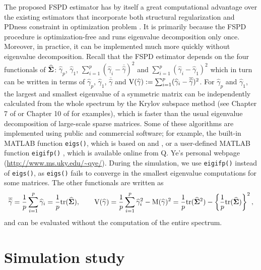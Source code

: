 \documentclass[times,sort&compress,3p]{elsarticle}
\newcommand{\NN}{\nonumber}
\newcommand{\tr}{\mathrm{tr}}
\begin{document}
The proposed FSPD estimator has by itself a great computational advantage over the existing estimators
that incorporate both structural regularization and PDness constraint in optimization problem
\citep{Rothman2012,Xue2012,Liu2014}. It is primarily because the FSPD procedure is optimization-free
and runs eigenvalue decomposition only once. Moreover, in practice, it can be implemented much more quickly without eigenvalue decomposition.
Recall that the FSPD estimator depends on the four functionals of $\widehat{\bf \Sigma}$: $\widehat{\gamma}_{p}$, $\widehat{\gamma}_{1}$, 
$\sum_{i=1}^p ({\widehat{\gamma}}_i - {\overline{\widehat{\gamma}}})^2$ and $\sum_{i=1}^p ({\widehat{\gamma}}_i - {\widehat{\gamma}}_1)^2$ which in turn can be written in terms of 
$\widehat{\gamma}_{p}$, $\widehat{\gamma}_{1}$, $\overline{\widehat{\gamma}}$ 
and ${\rm V}(\widehat{\gamma}) := \sum_{i=1}^p ({\widehat{\gamma}}_i - {\overline{\widehat{\gamma}}})^2$. 
For $\widehat{\gamma}_{p}$ and $\widehat{\gamma}_{1}$, the largest and
smallest eigenvalue of a symmetric matrix
can be independently calculated from the whole spectrum by the Krylov subspace method
(see Chapter 7 of \citet{Demmel1997} or Chapter 10 of \citet{Golub2012} for examples), which
 is faster than the usual eigenvalue decomposition of large-scale sparse matrices. Some of these
 algorithms are implemented using public and commercial software; for example, the built-in \textsf{MATLAB} function
 \texttt{eigs()}, which is based
 on \citet{Lehoucq1996} and \citet{Sorensen1990}, or a user-defined \textsf{MATLAB} function \texttt{eigifp()}
 \citep{Golub2002}, which is available online from Q. Ye's personal webpage (\url{http://www.ms.uky.edu/~qye/}). During the simulation, we use
 \texttt{eigifp()} instead of \texttt{eigs()}, as \texttt{eigs()} fails to converge in the
 smallest eigenvalue computations for some matrices.
The other functionals are  written as
\[
{\overline{\widehat{\gamma}}} = \frac{1}{p} \sum_{i=1}^p \widehat{\gamma}_i = \frac{1}{p} \tr(\widehat{\bf \Sigma}), \qquad
{\rm V}(\widehat{\gamma}) = \frac{1}{p} \sum_{i=1}^p \widehat{\gamma}_i^2 - {\rm M}(\widehat{\gamma})^2 =
\frac{1}{p} \tr(\widehat{\bf \Sigma}^2) - \left\{\frac{1}{p} \tr(\widehat{\bf \Sigma}) \right\}^2, \NN
\]
and can
be evaluated without the computation of the entire spectrum.


\section{Simulation study}\label{sec:simulation}
\end{document}
